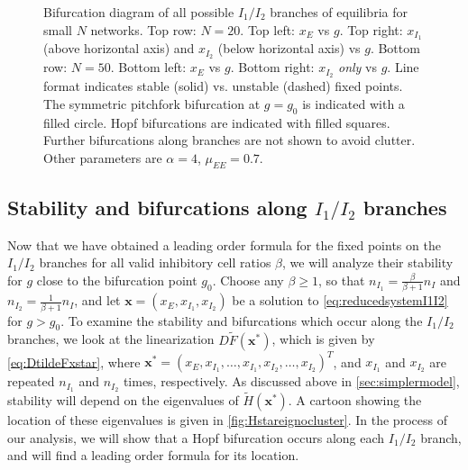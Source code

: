 \documentclass[reqno]{siamonline190516}
\newcommand{\xvec}{\mathbf{x}}
\begin{document}
\begin{figure}
\begin{tabular}{cc}
    \end{tabular}
    \caption{Bifurcation diagram of all possible $I_1/I_2$ branches of equilibria for small $N$ networks. Top row: $N=20$. Top left: $x_E$ vs $g$. Top right: $x_{I_1}$ (above horizontal axis) and $x_{I_2}$ (below horizontal axis) vs $g$. Bottom row: $N=50$. Bottom left: $x_E$ vs $g$. Bottom right: $x_{I_2}$ \emph{only} vs $g$. Line format indicates stable (solid) vs. unstable (dashed) fixed points. The symmetric pitchfork bifurcation at $g = g_0$ is indicated with a filled circle. Hopf bifurcations are indicated with filled squares. Further bifurcations along branches are not shown to avoid clutter. Other parameters are $\alpha = 4$, $\mu_{EE} = 0.7$.}
    \label{fig:noclusterBD1}
\end{figure}

\subsection{Stability and bifurcations along \texorpdfstring{$I_1/I_2$}{I1/I2} branches}\label{sec:I1I2stability}

Now that we have obtained a leading order formula for the fixed points on the $I_1/I_2$ branches for all valid inhibitory cell ratios $\beta$, we will analyze their stability for $g$ close to the bifurcation point $g_0$. Choose any $\beta \geq 1$, so that $n_{I_1} = \frac{\beta}{\beta+1}n_I$ and $n_{I_2} = \frac{1}{\beta+1}n_I$, and let $\xvec = (x_E, x_{I_1}, x_{I_2})$ be a solution to \cref{eq:reducedsystemI1I2} for $g > g_0$. To examine the stability and bifurcations which occur along the $I_1/I_2$ branches, we look at the linearization $D\tilde{F}(\xvec^*)$, which is given by \cref{eq:DtildeFxstar}, where $\xvec^* = (x_E, x_{I_1}, \dots, x_{I_1}, x_{I_2}, \dots, x_{I_2})^T$, and $x_{I_1}$ and $x_{I_2}$ are repeated $n_{I_1}$ and $n_{I_2}$ times, respectively. As discussed above in \cref{sec:simplermodel}, stability will depend on the eigenvalues of $\tilde{H}(\xvec^*)$. A cartoon showing the location of these eigenvalues is given in \cref{fig:Hstareignocluster}. In the process of our analysis, we will show that a Hopf bifurcation occurs along each $I_1/I_2$ branch, and will find a leading order formula for its location.
\end{document}
